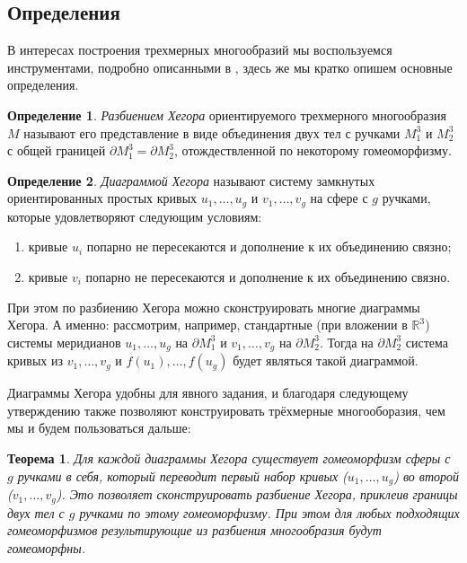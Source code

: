 \documentclass[a4paper, 12pt]{article}
\newtheorem*{theorem}{Теорема}
\theoremstyle{definition}
\newtheorem{definition}{Определение}
\begin{document}
    \subsection{Определения}
    
        В интересах построения трехмерных многообразий мы воспользуемся инструментами, подробно описанными в \cite[Глава 4]{1997-hj}, здесь же мы кратко опишем основные определения. 

        \begin{definition}
            \textit{Разбиением Хегора} ориентируемого трехмерного многообразия $M$ называют его представление в виде объединения двух тел с ручками $M_1^3$ и $M_2^3$ с общей границей $\partial M_1^3 = \partial M_2^3$, отождествленной по некоторому гомеоморфизму.
        \end{definition}

        \begin{definition}
            \textit{Диаграммой Хегора} называют систему замкнутых ориентированных простых кривых $u_1, \dots, u_g$ и $v_1, \dots, v_g$ на сфере с $g$ ручками, которые удовлетворяют следующим условиям: 
            \begin{enumerate}[label=(\roman*)]
                \item кривые $u_i$ попарно не пересекаются и дополнение к их объединению связно;
                \item кривые $v_i$ попарно не пересекаются и дополнение к их объединению связно.
            \end{enumerate}
        \end{definition}

        При этом по разбиению Хегора можно сконструировать многие диаграммы Хегора. А именно: рассмотрим, например, стандартные (при вложении в $\mathbb{R}^3$) системы меридианов $u_1, \dots, u_g$ на $\partial M^3_1$ и $v_1, \dots, v_g$ на $\partial M^3_2$. Тогда на $\partial M^3_2$ система кривых из $v_1, \dots, v_g$ и $f(u_1), \dots, f(u_g)$ будет являться такой диаграммой.

        Диаграммы Хегора удобны для явного задания, и благодаря следующему утверждению \cite[Глава 4, \S 10.3]{1997-hj} также позволяют конструировать трёхмерные многооборазия, чем мы и будем пользоваться дальше: 

        \begin{theorem}
            Для каждой диаграммы Хегора существует гомеоморфизм сферы с $g$ ручками в себя, который переводит первый набор кривых ($u_1, \dots, u_g$) во второй ($v_1, \dots, v_g$). Это позволяет сконструировать разбиение Хегора, приклеив границы двух тел с $g$ ручками по этому гомеоморфизму. При этом для любых подходящих гомеоморфизмов результирующие из разбиения многообразия будут гомеоморфны.
        \end{theorem}
\end{document}
